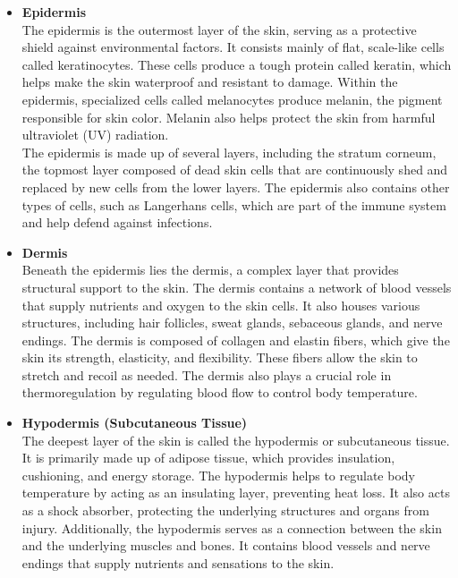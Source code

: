 \begin{itemize}
 \item \textbf{Epidermis} \\

The epidermis is the outermost layer of the skin, serving as a protective shield against environmental factors. It consists mainly of flat, scale-like cells called keratinocytes. These cells produce a tough protein called keratin, which helps make the skin waterproof and resistant to damage. Within the epidermis, specialized cells called melanocytes produce melanin, the pigment responsible for skin color. Melanin also helps protect the skin from harmful ultraviolet (UV) radiation. \\

The epidermis is made up of several layers, including the stratum corneum, the topmost layer composed of dead skin cells that are continuously shed and replaced by new cells from the lower layers. The epidermis also contains other types of cells, such as Langerhans cells, which are part of the immune system and help defend against infections.

\newpage

\item \textbf{Dermis} \\

Beneath the epidermis lies the dermis, a complex layer that provides structural support to the skin. The dermis contains a network of blood vessels that supply nutrients and oxygen to the skin cells. It also houses various structures, including hair follicles, sweat glands, sebaceous glands, and nerve endings.
The dermis is composed of collagen and elastin fibers, which give the skin its strength, elasticity, and flexibility. These fibers allow the skin to stretch and recoil as needed. The dermis also plays a crucial role in thermoregulation by regulating blood flow to control body temperature.

\item \textbf{Hypodermis (Subcutaneous Tissue)} \\

The deepest layer of the skin is called the hypodermis or subcutaneous tissue. It is primarily made up of adipose tissue, which provides insulation, cushioning, and energy storage. The hypodermis helps to regulate body temperature by acting as an insulating layer, preventing heat loss. It also acts as a shock absorber, protecting the underlying structures and organs from injury.
Additionally, the hypodermis serves as a connection between the skin and the underlying muscles and bones. It contains blood vessels and nerve endings that supply nutrients and sensations to the skin.


\end{itemize}

